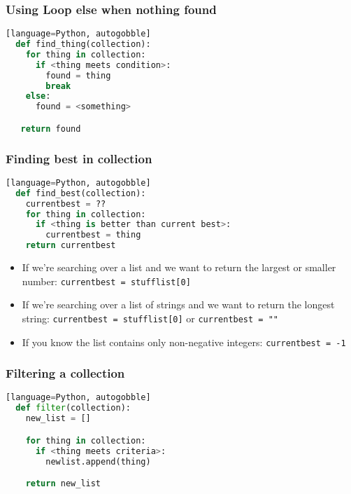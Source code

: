 \documentclass{beamer}
\begin{document}
%
%
\begin{frame}[fragile]
  \frametitle{Using Loop else when nothing found}
  \begin{lstlisting}[language=Python, autogobble][language=Python, autogobble]
  def find_thing(collection):
    for thing in collection:
      if <thing meets condition>:
        found = thing
        break
    else:
      found = <something>

   return found
  \end{lstlisting}
\end{frame}

%
%
\begin{frame}[fragile]
  \frametitle{Finding best in collection}
  \begin{lstlisting}[language=Python, autogobble][language=Python, autogobble]
  def find_best(collection):
    currentbest = ??
    for thing in collection:
      if <thing is better than current best>:
        currentbest = thing
    return currentbest 
  \end{lstlisting}
  \vfill
  \begin{itemize}
    \item If we're searching over a list and we want to return the largest or smaller number: \lstinline|currentbest = stufflist[0]| \pause
    \item If we're searching over a list of strings and we want to return the longest string: \lstinline|currentbest = stufflist[0]| or \lstinline|currentbest = ""| \pause
    \item If you know the list contains only non-negative integers: \lstinline|currentbest = -1|
  \end{itemize}
\end{frame}

%
%
\begin{frame}[fragile]
  \frametitle{Filtering a collection}
  \begin{lstlisting}[language=Python, autogobble][language=Python, autogobble]
  def filter(collection):
    new_list = []

    for thing in collection:
      if <thing meets criteria>:
        newlist.append(thing)

    return new_list
  \end{lstlisting}
\end{frame}
\end{document}
